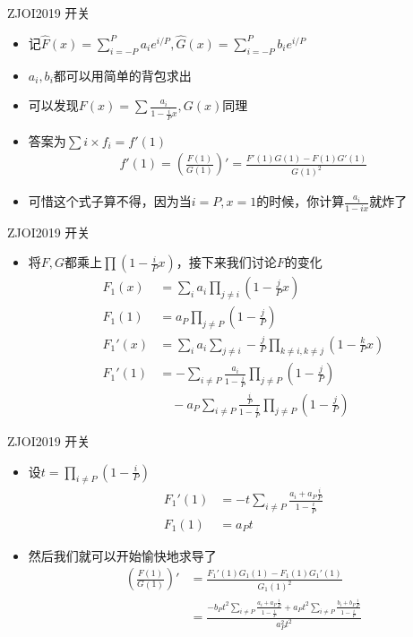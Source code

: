 \documentclass{beamer}
\begin{document}
\begin{frame}{ZJOI2019 开关}
    \begin{itemize}
        \item 记$\hat F(x) = \sum\limits_{i = -P} ^ P a_i e^{i / P}, \hat G(x) = \sum\limits_{i = -P}^P b_i e^{i / P}$
        \item $a_i, b_i$都可以用简单的背包求出
        \item 可以发现$F(x) = \sum\frac{a_i}{1 - \frac{i}{P}x}, G(x)$同理
        \item 答案为$\sum i\times f_i = f'(1)$
        $$\begin{aligned}
            f'(1) = \left(\frac{F(1)}{G(1)}\right)' = \frac{F'(1)G(1) - F(1)G'(1)}{G(1)^2}
        \end{aligned}$$
        \item 可惜这个式子算不得，因为当$i = P, x = 1$的时候，你计算$\frac{a_i}{1 - ix}$就炸了
    \end{itemize}
\end{frame}

\begin{frame}{ZJOI2019 开关}
    \begin{itemize}
        \item 将$F, G$都乘上$\prod(1 - \frac{i}{P}x)$，接下来我们讨论$F$的变化
        $$\begin{aligned}
            F_1(x) &= \sum_i a_i \prod_{j\neq i} (1 - \frac{j}{P}x)\\
            F_1(1) &= a_P \prod_{j\neq P} (1 - \frac{j}{P})\\
            F_1'(x) &= \sum_i a_i\sum_{j\neq i}-\frac{j}{P} \prod_{k\neq i, k\neq j} (1 - \frac{k}{P}x)\\
            F_1'(1) &= -\sum_{i\neq P}\frac{a_i}{1 - \frac{i}{P}}\prod_{j\neq P}(1 - \frac{j}{P})\\
            &\quad - a_P\sum_{i\neq P}\frac{\frac{i}{P}}{1 - \frac{i}{P}}\prod_{j\neq P}(1 - \frac{j}P)
        \end{aligned}$$
    \end{itemize}
\end{frame}

\begin{frame}{ZJOI2019 开关}
    \begin{itemize}
        \item 设$t = \prod\limits_{i\neq P}(1 - \frac{i}{P})$
        $$\begin{aligned}
            F_1'(1) &= -t\sum_{i\neq P}\frac{a_i + a_P\frac{i}{P}}{1 - \frac{i}{P}}\\
            F_1(1) &= a_Pt
        \end{aligned}$$
        \item 然后我们就可以开始愉快地求导了
        $$\begin{aligned}
            \left(\frac{F(1)}{G(1)}\right)' &= \frac{F_1'(1)G_1(1) - F_1(1)G_1'(1)}{G_1(1)^2}\\
            &= \frac{-b_Pt^2\sum_{i\neq P}\frac{a_i + a_P\frac{i}{P}}{1 - \frac{i}{P}} + a_Pt^2\sum_{i\neq P}\frac{b_i + b_P\frac{i}{P}}{1 - \frac{i}{P}}}{a_P^2t^2}
        \end{aligned}$$
    \end{itemize}
\end{frame}
\end{document}
